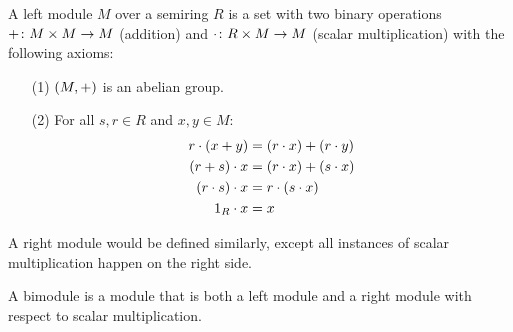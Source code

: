 \begin{definition}
  A left module \(M\) over a semiring \(R\)
  is a set with two binary operations
  \(+ \colon M \times M \to M\) (addition)
  and \(\cdot \colon R \times M \to M\) (scalar multiplication)
  with the following axioms:
  \begin{enumerate}
    \item[(1)]
      \(\left(M, +\right)\) is an abelian group.

    \item[(2)]
      For all \(s, r \in R\) and \(x ,y \in M\):
      \begin{align*}
        r \cdot \left(x + y\right)
          &= \left(r \cdot x\right) + \left(r \cdot y\right) \\
        \left(r + s\right) \cdot x
          &= \left(r \cdot x\right) + \left(s \cdot x\right) \\
        \left(r \cdot s\right) \cdot x
          &= r \cdot \left(s \cdot x\right) \\
        1_{R} \cdot x
          &= x
      \end{align*}
  \end{enumerate}
\end{definition}


\begin{definition}
  A right module would be defined similarly, except
  all instances of scalar multiplication happen on the right side.
\end{definition}


\begin{definition}
  A bimodule is a module that is both a left module and a right module
  with respect to scalar multiplication.
\end{definition}

